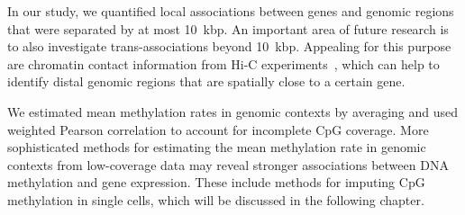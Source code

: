 In our study, we quantified local associations between genes and genomic regions that were separated by at most 10~kbp. An important area of future research is to also investigate trans-associations beyond 10~kbp. Appealing for this purpose are chromatin contact information from Hi-C experiments~\citep{de_wit_decade_2012}, which can help to identify distal genomic regions that are spatially close to a certain gene.

We estimated mean methylation rates in genomic contexts by averaging and used weighted Pearson correlation to account for incomplete CpG coverage. More sophisticated methods for estimating the mean methylation rate in genomic contexts from low-coverage data may reveal stronger associations between DNA methylation and gene expression. These include methods for imputing CpG methylation in single cells, which will be discussed in the following chapter.
